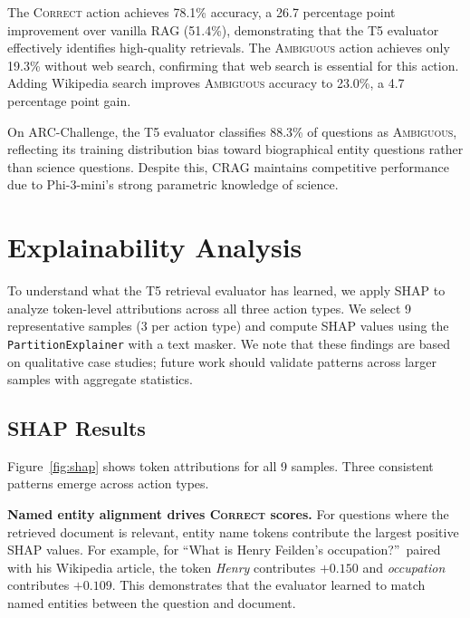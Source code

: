 \documentclass[11pt]{article}
\begin{document}
The \textsc{Correct} action achieves 78.1\% accuracy, a 26.7 percentage point improvement over
vanilla RAG (51.4\%), demonstrating that the T5 evaluator effectively identifies high-quality
retrievals. The \textsc{Ambiguous} action achieves only 19.3\% without web search, confirming that
web search is essential for this action. Adding Wikipedia search improves \textsc{Ambiguous}
accuracy to 23.0\%, a 4.7 percentage point gain.

On ARC-Challenge, the T5 evaluator classifies 88.3\% of questions as \textsc{Ambiguous},
reflecting its training distribution bias toward biographical entity questions rather than science
questions. Despite this, CRAG maintains competitive performance due to Phi-3-mini's strong
parametric knowledge of science.

\clearpage
\section{Explainability Analysis}

To understand what the T5 retrieval evaluator has learned, we apply SHAP to analyze token-level
attributions across all three action types. We select 9 representative samples (3 per action type)
and compute SHAP values using the \texttt{PartitionExplainer} with a text masker. We note that
these findings are based on qualitative case studies; future work should validate patterns across
larger samples with aggregate statistics.

\subsection{SHAP Results}

Figure~\ref{fig:shap} shows token attributions for all 9 samples. Three consistent patterns emerge
across action types.

\textbf{Named entity alignment drives \textsc{Correct} scores.} For questions where the retrieved
document is relevant, entity name tokens contribute the largest positive SHAP values. For example,
for ``What is Henry Feilden's occupation?''\ paired with his Wikipedia article, the token
\textit{Henry} contributes $+0.150$ and \textit{occupation} contributes $+0.109$. This
demonstrates that the evaluator learned to match named entities between the question and document.
\end{document}
